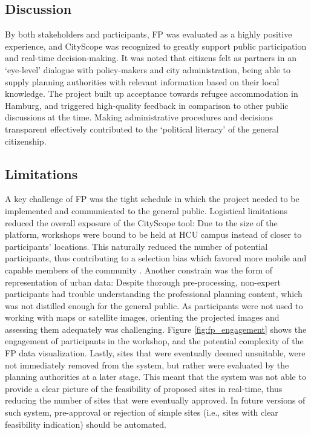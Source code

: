 {    \subsection{Discussion}
    {
        By both stakeholders and participants, FP was evaluated as a highly positive experience, and CityScope was recognized to greatly support public participation and real-time decision-making. It was noted that citizens felt as partners in an `eye-level' dialogue with policy-makers and city administration, being able to supply planning authorities with relevant information based on their local knowledge. The project built up acceptance towards refugee accommodation in Hamburg, and triggered high-quality feedback in comparison to other public discussions at the time. Making administrative procedures and decisions transparent effectively contributed to the `political literacy' of the general citizenship.

        \subsection{Limitations}
        {
            A key challenge of FP was the tight schedule in which the project needed to be implemented and communicated to the general public. Logistical limitations reduced the overall exposure of the CityScope tool: Due to the size of the platform, workshops were bound to be held at HCU campus instead of closer to participants' locations. This naturally reduced the number of potential participants, thus contributing to a selection bias which favored more mobile and capable members of the community \cite{Innes2016}.
            \newline
            Another constrain was the form of representation of urban data: Despite thorough pre-processing, non-expert participants had trouble understanding the professional planning content, which was not distilled enough for the general public. As participants were not used to working with maps or satellite images, orienting the projected images and assessing them adequately was challenging. Figure \eqref{fig:fp_engagement} shows the engagement of participants in the workshop, and the potential complexity of the FP data visualization.
            \newline
            Lastly, sites that were eventually deemed unsuitable, were not immediately removed from the system, but rather were evaluated by the planning authorities at a later stage. This meant that the system was not able to provide a clear picture of the feasibility of proposed sites in real-time, thus reducing the number of sites that were eventually approved. In future versions of such system, pre-approval or rejection of simple sites (i.e., sites with clear feasibility indication) should be automated.
        }
    }

}
